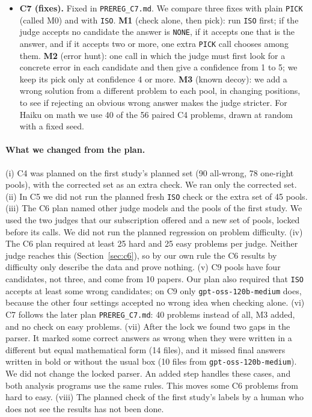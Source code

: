 \documentclass[10pt,twocolumn]{article}
\begin{document}
\begin{itemize}
\item \textbf{C7 (fixes).} Fixed in \texttt{PREREG\_C7.md}. We compare three fixes with plain \texttt{PICK} (called M0) and with \texttt{ISO}. \textbf{M1} (check alone, then pick): run \texttt{ISO} first; if the judge accepts no candidate the answer is \texttt{NONE}, if it accepts one that is the answer, and if it accepts two or more, one extra \texttt{PICK} call chooses among them. \textbf{M2} (error hunt): one call in which the judge must first look for a concrete error in each candidate and then give a confidence from 1 to 5; we keep its pick only at confidence 4 or more. \textbf{M3} (known decoy): we add a wrong solution from a different problem to each pool, in changing positions, to see if rejecting an obvious wrong answer makes the judge stricter. For Haiku on math we use 40 of the 56 paired C4 problems, drawn at random with a fixed seed.
\end{itemize}

\paragraph{What we changed from the plan.}
(i) C4 was planned on the first study's planned set (90 all-wrong, 78 one-right pools), with the corrected set as an extra check. We ran only the corrected set. (ii) In C5 we did not run the planned fresh \texttt{ISO} check or the extra set of 45 pools. (iii) The C6 plan named other judge models and the pools of the first study. We used the two judges that our subscription offered and a new set of pools, locked before its calls. We did not run the planned regression on problem difficulty. (iv) The C6 plan required at least 25 hard and 25 easy problems per judge. Neither judge reaches this (Section~\ref{sec:c6}), so by our own rule the C6 results by difficulty only describe the data and prove nothing. (v) C9 pools have four candidates, not three, and come from 10 papers. Our plan also required that \texttt{ISO} accepts at least some wrong candidates; on C9 only \texttt{gpt-oss-120b-medium} does, because the other four settings accepted no wrong idea when checking alone. (vi) C7 follows the later plan \texttt{PREREG\_C7.md}: 40 problems instead of all, M3 added, and no check on easy problems. (vii) After the lock we found two gaps in the parser. It marked some correct answers as wrong when they were written in a different but equal mathematical form (14 files), and it missed final answers written in bold or without the usual box (10 files from \texttt{gpt-oss-120b-medium}). We did not change the locked parser. An added step handles these cases, and both analysis programs use the same rules. This moves some C6 problems from hard to easy. (viii) The planned check of the first study's labels by a human who does not see the results has not been done.
\end{document}
